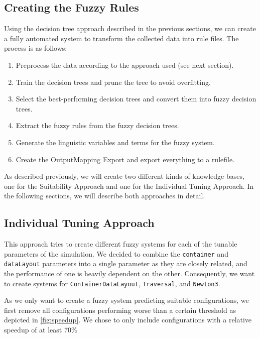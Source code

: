 \subsection{Creating the Fuzzy Rules}

Using the decision tree approach described in the previous sections, we can create a fully automated system to transform the collected data into rule files. The process is as follows:

\begin{enumerate}
    \item Preprocess the data according to the approach used (see next section).
    \item Train the decision trees and prune the tree to avoid overfitting.
    \item Select the best-performing decision trees and convert them into fuzzy decision trees.
    \item Extract the fuzzy rules from the fuzzy decision trees.
    \item Generate the linguistic variables and terms for the fuzzy system.
    \item Create the OutputMapping Export and export everything to a rulefile.
\end{enumerate}

As described previously, we will create two different kinds of knowledge bases, one for the Suitability Approach and one for the Individual Tuning Approach. In the following sections, we will describe both approaches in detail.

\subsection{Individual Tuning Approach}

This approach tries to create different fuzzy systems for each of the tunable parameters of the simulation. We decided to combine the \texttt{container} and \texttt{dataLayout} parameters into a single parameter as they are closely related, and the performance of one is heavily dependent on the other. Consequently, we want to create systems for \texttt{ContainerDataLayout}, \texttt{Traversal}, and \texttt{Newton3}.

As we only want to create a fuzzy system predicting suitable configurations, we first remove all configurations performing worse than a certain threshold as depicted in \autoref{fig:speedup}. We chose to only include configurations with a relative speedup of at least 70\% %

